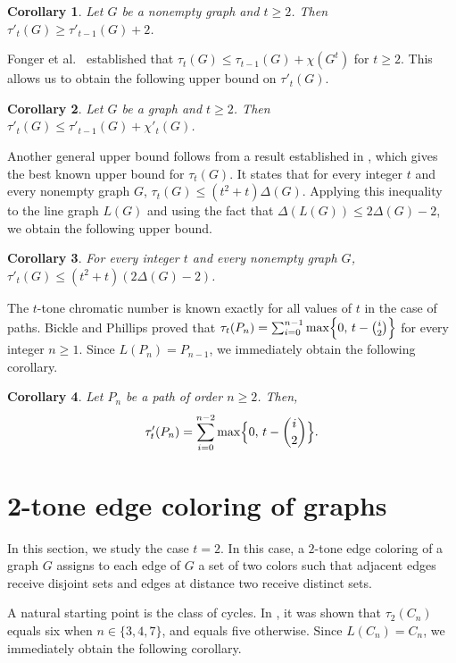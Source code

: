 \documentclass[12pt]{article}
\theoremstyle{plain}
\numberwithin{theorem}{section}
\numberwithin{conjecture}{section}
\newtheorem{corollary}{Corollary}
\numberwithin{corollary}{section}
\numberwithin{example}{section}
\numberwithin{lemma}{section}
\numberwithin{proposition}{section}
\numberwithin{problem}{section}
\numberwithin{remark}{section}
\numberwithin{claim}{theorem}
\numberwithin{definition}{section}
\begin{document}
\begin{corollary}
Let $G$ be a nonempty graph and $t \ge 2$. Then $\tau'_t(G) \ge \tau'_{t-1}(G) + 2$.  
\end{corollary}

Fonger et al.\ \cite{F} established that $\tau_t(G) \le \tau_{t-1}(G) + \chi(G^t)$ for $t \ge 2$. This allows us to obtain the following upper bound on $\tau'_t(G)$.

\begin{corollary}
Let $G$ be a graph and $t \ge 2$. Then $\tau'_t(G) \le \tau'_{t-1}(G) + \chi'_t(G)$.
\end{corollary}

Another general upper bound follows from a result established in \cite{C1}, which gives the best known upper bound for $\tau_t(G)$. It states that for every integer $t$ and every nonempty graph $G$, $\tau_t(G) \le (t^2 + t)\Delta(G)$. Applying this inequality to the line graph $L(G)$ and using the fact that $\Delta(L(G)) \le 2\Delta(G) - 2$, we obtain the following upper bound.

\begin{corollary}
For every integer $t$ and every nonempty graph $G$, $\tau'_t(G) \le (t^2 + t)(2\Delta(G) - 2)$.
\end{corollary}

The $t$-tone chromatic number is known exactly for all values of $t$ in the case of paths. Bickle and Phillips \cite{BP} proved that $\tau_t(P_n) =\sum_{i=0}^{n-1} \max \Bigl\{ 0,\, t - \binom{i}{2} \Bigr\}$ for every integer $n\ge1$. Since $L(P_n)=P_{n-1}$, we immediately obtain the following corollary.

\begin{corollary}\label{co1}
Let $P_n$ be a path of order $n\ge 2$. Then, \[\tau'_t(P_n) = \sum_{i=0}^{n-2} \max \Bigl\{ 0,\, t - \binom{i}{2} \Bigr\}.\]
\end{corollary}

\section{2-tone edge coloring of graphs}

In this section, we study the case $t=2$. In this case, a $2$-tone edge coloring of a graph $G$ assigns to each edge of $G$ a set of two colors such that adjacent edges receive disjoint sets and edges at distance two receive distinct sets.

A natural starting point is the class of cycles. In \cite{BP}, it was shown that $\tau_2(C_n)$ equals six when $n\in \{3,4,7\}$, and equals five otherwise. Since $L(C_n)=C_n$, we immediately obtain the following corollary.
\end{document}
